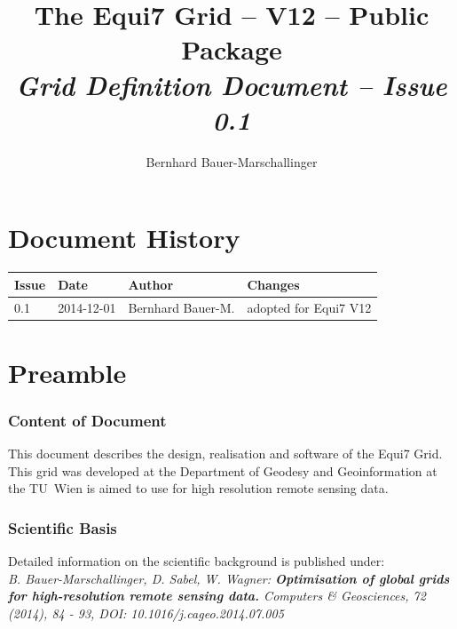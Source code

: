 \documentclass[11pt,a4paper]{article}
\begin{document}
\author{Bernhard Bauer-Marschallinger}
\title{\textbf{The Equi7 Grid -- V12 -- Public Package} \\ \vspace{10 mm} \Large \textbf{\textit{Grid Definition Document -- Issue 0.1}}}
\maketitle


\newpage

\parskip 4pt
\tableofcontents

\newpage

\section*{Document History}

\begin{tabular}{llll}
\hline 
\textbf{Issue} & \textbf{Date} & \textbf{Author} & \textbf{Changes} \\ 
\hline 
0.1 & 2014-12-01 & Bernhard Bauer-M. & adopted for Equi7 V12 \\ 
\hline 
\end{tabular} 

\newpage

\section{Preamble}
\label{sec:preamble}

\subsubsection*{Content of Document}
This document describes the design, realisation and software of the Equi7 Grid. This grid was developed at the Department of Geodesy and Geoinformation at the TU~Wien is aimed to use for high resolution remote sensing data. 

\subsubsection*{Scientific Basis}
Detailed information on the scientific background is published under: \\
\textit{B. Bauer-Marschallinger, D. Sabel, W. Wagner: \textbf{Optimisation of global grids for high-resolution remote sensing data.} Computers \& Geosciences, 72 (2014), 84 - 93, DOI: 10.1016/j.cageo.2014.07.005}
\end{document}
